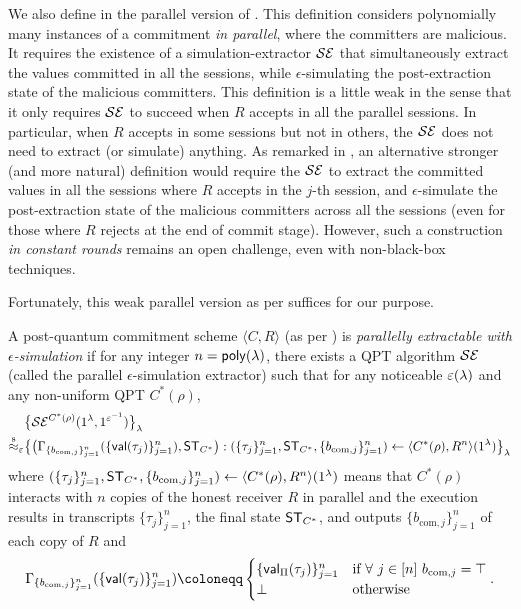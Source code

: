  We also define in  the parallel version of . This definition considers polynomially many instances of a commitment {\em in parallel}, where the committers are malicious. It requires the existence of a simulation-extractor $\mathcal{SE}$ that simultaneously extract the values committed in all the sessions, while $\epsilon$-simulating the post-extraction state of the malicious committers. This definition is a little weak in the sense that it only requires $\mathcal{SE}$ to succeed when $R$ accepts in all the parallel sessions. In particular, when $R$ accepts in some sessions but not in others, the $\mathcal{SE}$ does not need to extract (or simulate) anything. As remarked in \cite{C:CCLY22}, an alternative stronger (and more natural) definition would require the $\mathcal{SE}$ to extract the committed values in all the sessions where $R$ accepts in the $j$-th session, and $\epsilon$-simulate the post-extraction state of the malicious committers across all the sessions (even for those where $R$ rejects at the end of commit stage). However, such a construction {\em in constant rounds} remains an open challenge, even with non-black-box techniques.


Fortunately, this weak parallel version as per  suffices for our purpose.




\begin{definition}\label{def:epsilon-sim-ext-com:parallel}
A post-quantum commitment scheme $\langle C, R\rangle$ (as per ) is {\em parallelly extractable with $\epsilon$-simulation} if 
for any integer $n=\mathsf{poly}(\lambda)$, there exists a QPT algorithm $\mathcal{SE}$ (called the parallel $\epsilon$-simulation extractor) such that for any noticeable $\varepsilon(\lambda)$ and any non-uniform QPT $C^*(\rho)$, 
\begin{align*}
&\big\{ \mathcal{SE}^{C^*(\rho)}(1^\lambda,1^{\varepsilon^{-1}}) \big\}_\lambda\\
\stackrel{\text{s}}{\approx}_\varepsilon
&\big\{\big(\Gamma_{\{b_{\mathrm{com},j}\}_{j=1}^{n}}(\{\mathsf{val}(\tau_j)\}_{j=1}^{n}), \mathsf{ST}_{C^*}\big):(\{\tau_j\}_{j=1}^{n},\mathsf{ST}_{C^*},\{b_{\mathrm{com},j}\}_{j=1}^{n})\gets\langle C^*(\rho), R^n \rangle(1^\lambda)\big\}_\lambda
\end{align*}
where 
$(\{\tau_j\}_{j=1}^{n},\mathsf{ST}_{C^*},\{b_{\mathrm{com},j}\}_{j=1}^{n})\gets\langle C^*(\rho), R^n \rangle(1^\lambda)$
means that $C^*(\rho)$ interacts with $n$ copies of the honest receiver $R$ in parallel and the execution results in transcripts  $\{\tau_j\}_{j=1}^{n}$, the final state $\mathsf{ST}_{C^*}$, and outputs $\{b_{\mathrm{com},j}\}_{j=1}^{n}$ of each copy of $R$ and 
$$\Gamma_{\{b_{\mathrm{com},j}\}_{j=1}^{n}}(\{\val(\tau_j)\}_{j=1}^{n}) \coloneqq 
\begin{cases}
\{\val_\Prot(\tau_j)\}_{j=1}^{n} & \text{if}~\forall~j\in[n]~ b_{\mathrm{com},j} = \top \\
\bot & \text{otherwise}
\end{cases}.
$$
\end{definition}

